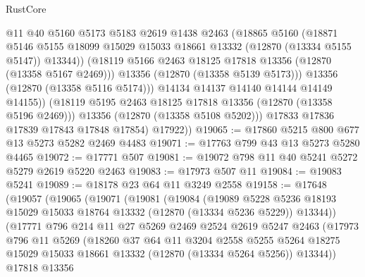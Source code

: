 \begin{lexlean}{RustCore}
\begin{coremodule}
                    @11
                    @40
                    @5160
                    @5173
                    @5183
                    @2619
                    @1438
                    @2463
                    (@18865
                      @5160
                      (@18871
                        @5146
                        @5155
                        @18099
                        @15029
                        @15033
                        @18661
                        @13332
                        (@12870 (@13334 @5155 @5147))
                        @13344))
                    (@18119 @5166 @2463 @18125 @17818 @13356 (@12870 (@13358 @5167 @2469)))
                    @13356
                    (@12870 (@13358 @5139 @5173)))
                  @13356
                  (@12870 (@13358 @5116 @5174)))
                @14134
                @14137
                @14140
                @14144
                @14149
                @14155))
            (@18119 @5195 @2463 @18125 @17818 @13356 (@12870 (@13358 @5196 @2469)))
            @13356
            (@12870 (@13358 @5108 @5202)))
          @17833
          @17836
          @17839
          @17843
          @17848
          @17854)
        @17922))
@19065 := @17860 @5215 @800 @677 @13 @5273 @5282 @2469 @4483
@19071 := @17763 @799 @43 @13 @5273 @5280 @4465
@19072 := @17771 @507
@19081 := @19072 @798 @11 @40 @5241 @5272 @5279 @2619 @5220 @2463
@19083 := @17973 @507 @11
@19084 := @19083 @5241
@19089 := @18178 @23 @64 @11 @3249 @2558
@19158 := @17648
    (@19057
      (@19065
        (@19071
          (@19081
            (@19084
              (@19089
                @5228
                @5236
                @18193
                @15029
                @15033
                @18764
                @13332
                (@12870 (@13334 @5236 @5229))
                @13344))
            (@17771
              @796
              @214
              @11
              @27
              @5269
              @2469
              @2524
              @2619
              @5247
              @2463
              (@17973
                @796
                @11
                @5269
                (@18260
                  @37
                  @64
                  @11
                  @3204
                  @2558
                  @5255
                  @5264
                  @18275
                  @15029
                  @15033
                  @18661
                  @13332
                  (@12870 (@13334 @5264 @5256))
                  @13344))
              @17818
              @13356

\end{coremodule}
\end{lexlean}
